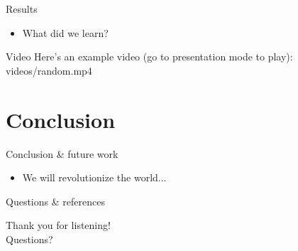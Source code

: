\documentclass[compress]{beamer}
\begin{document}
\begin{frame}{Results}
	\begin{itemize}
		\item What did we learn?
	\end{itemize}
\end{frame}

\begin{frame}{Video}
	Here's an example video (go to presentation mode to play):
        {videos/random.mp4}
\end{frame}

\section{Conclusion}

\begin{frame}{Conclusion \& future work}
	\begin{itemize}
		\item We will revolutionize the world...
	\end{itemize}
\end{frame}

\begin{frame}{Questions \& references}
	\begin{center}
		\LARGE
		Thank you for listening!\\ \vspace{10pt}Questions?
	\end{center}
	\fontsize{7pt}{8.4}\selectfont
	
	
\end{frame}
\end{document}
